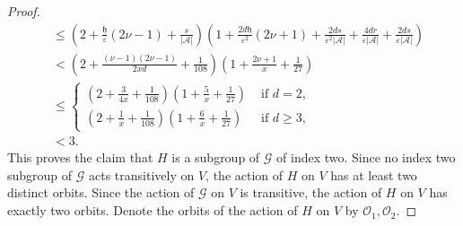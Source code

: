 \documentclass[10pt]{article}
\theoremstyle{definition}
\newcommand{\calG}{\ensuremath{\mathcal{G}}}
\newcommand{\calO}{\ensuremath{\mathcal{O}}}
\newcommand{\scrA}{\ensuremath{\mathscr{A}}}
\newcommand{\tth}{\ensuremath{\mathfrak{h}}}
\begin{document}
\begin{proof}
\begin{align*}
& 
\leq 
\left(2 + \frac{\tth}{\varepsilon} (2\nu -1) + \frac{s}{|\scrA|} \right) \left( 1 + \frac{2d\tth}{\varepsilon^2}(2\nu+ 1) + \frac{2ds}{\varepsilon^2|\scrA|} + \frac{4dr}{\varepsilon |\scrA|} + \frac{2ds}{\varepsilon |\scrA|}  \right)\\
& 
< 
\left(2 + \frac{(\nu-1)(2\nu -1)}{2xd} +\frac{1}{108} \right) \left( 1 + \frac{2\nu+ 1}{x}+ \frac 1{27}\right)\\
& 
\leq 
\begin{cases}
\left(2 + \frac 3{4x}+ \frac{1}{108}\right) \left( 1 + \frac{5}{x}+ \frac 1{27}\right) & \text{ if } d = 2, \\
\left(2 + \frac 1{x} + \frac{1}{108}\right) \left( 1 + \frac{6}{x}+ \frac 1{27}\right) & \text{ if } d \geq 3,
\end{cases}\\
& 
< 3.
\end{align*}
This proves the claim that $H$ is a subgroup of $\calG$ of index two. Since no index two subgroup of $\calG$ acts transitively on $V$, the action of $H$ on $V$ has at least two distinct orbits. Since the action of $\calG$ on $V$ is transitive, the action of $H$ on $V$ has exactly two orbits. Denote the orbits of the action of $H$ on $V$ by $\calO_1, \calO_2$.  


\end{proof}
\end{document}

